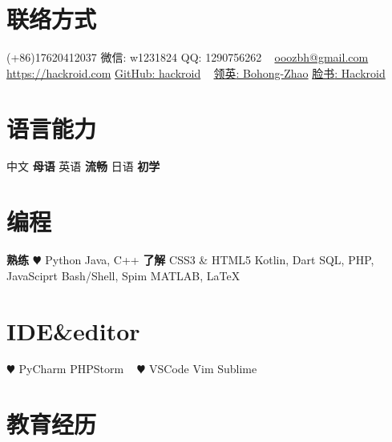 \documentclass[hidelinks__VERSION__]{adamyi-cv}
\begin{document}



\begin{aside} %
\section{\heir 联络方式}
(+86)17620412037
{\hei 微信\textrm{: w1231824}}
{\hei QQ\textrm{: 1290756262}}
~
\href{mailto:ooozbh@gmail.com}{ooozbh@gmail.com}
\href{https://hackroid.com}{https://hackroid.com}
\href{https://github.com/hackroid}{GitHub: hackroid}
~
\href{https://www.linkedin.com/in/%E5%8D%9A%E5%BC%98-%E8%B5%B5-b7ab09136/}{\hei 领英\textrm{: Bohong-Zhao}}
\href{https://www.facebook.com/Hackro1d}{\hei 脸书\textrm{: Hackroid}}
\section{\heir 语言能力}
{\hei 中文 \textbf{\hei 母语}
\hei 英语 \textbf{\hei 流畅}
\hei 日语 \textbf{\hei 初学}}
\section{\heir 编程}
\textbf{\hei 熟练}
{\color{red} $\varheart$} Python
Java, C++
\textbf{\hei 了解}
CSS3 \& HTML5
Kotlin, Dart
SQL, PHP, JavaSciprt
Bash/Shell, Spim
MATLAB, \LaTeX
\section{IDE\&editor}
{\color{red} $\varheart$} PyCharm
PHPStorm
~
{\color{red} $\varheart$} VSCode
Vim
Sublime
\versionsection
\end{aside}


\section{\heir 教育\heir 经历}
\end{document}
